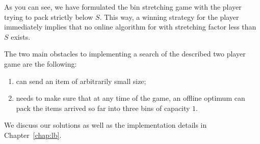 As you can see, we have formulated the bin stretching game with the
player \algo trying to pack strictly below $S$. This way, a winning
strategy for the player \adversary immediately implies that no online
algorithm for \binstretch with stretching factor less than $S$ exists.

The two main obstacles to implementing a search of the described two player
game are the following:

\begin{enumerate}
\item \adversary can send an item of arbitrarily small size;
\item \adversary needs to make sure that at any time of the game, an offline
  optimum can pack the items arrived so far into three bins of capacity $1$.
\end{enumerate}

We discuss our solutions as well as the implementation details in Chapter~\ref{chap:lb}.